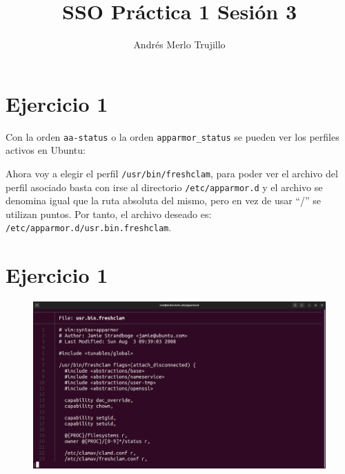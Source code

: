 \documentclass{article}
\title{SSO Práctica 1 Sesión 3}
\author{Andrés Merlo Trujillo}
\date{}
\begin{document}
\maketitle

\tableofcontents

\newpage

\section*{Ejercicio 1}
Con la orden \verb|aa-status| o la orden \verb|apparmor_status| se pueden ver los perfiles activos en Ubuntu:


Ahora voy a elegir el perfil \verb|/usr/bin/freshclam|, para poder ver el archivo del perfil asociado basta con irse al directorio \verb|/etc/apparmor.d| y el archivo se denomina igual que la ruta absoluta del mismo, pero en vez de usar ``/'' se utilizan puntos. Por tanto, el archivo deseado es: \verb|/etc/apparmor.d/usr.bin.freshclam|.

\section*{Ejercicio 1}

\begin{figure}[H]
    \includegraphics[width=\textwidth]{imagenes/Captura desde 2022-10-18 16-13-59.png}
\end{figure}
\end{document}
